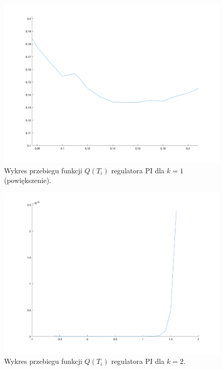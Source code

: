 \documentclass[a4paper,10pt]{article}
\begin{document}
\begin{figure}[!h]
    \centering
	\includegraphics[width=130mm]{PI-opt-k1-zoom.png}
	\caption{Wykres przebiegu funkcji $Q(T_{i})$ regulatora PI dla $k=1$ (powiększenie).}
    \label{fig:regulatorPIk1opt2}
\end{figure}
\begin{figure}[!h]
    \centering
	\includegraphics[width=130mm]{PI-opt-k2.png}
	\caption{Wykres przebiegu funkcji $Q(T_{i})$ regulatora PI dla $k=2$.}
    \label{fig:regulatorPIk2opt1}
\end{figure}

\newpage
\end{document}

